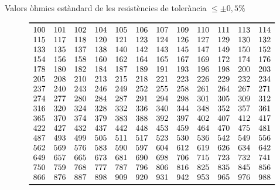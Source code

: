\begin{table}[htb]
   \caption{Valors \`{o}hmics est\`{a}ndard de les resist\`{e}ncies de toler\`{a}ncia $\leq\pm0{,}5\unit{\%}$}
   \[ \begin{array}{cccccccccccc}
   \toprule[1pt]
   100 & 101 & 102 & 104 & 105 & 106 & 107 & 109 & 110 & 111 & 113 & 114 \\
   115 & 117 & 118 & 120 & 121 & 123 & 124 & 126 & 127 & 129 & 130 & 132 \\
   133 & 135 & 137 & 138 & 140 & 142 & 143 & 145 & 147 & 149 & 150 & 152 \\
   154 & 156 & 158 & 160 & 162 & 164 & 165 & 167 & 169 & 172 & 174 & 176 \\
   178 & 180 & 182 & 184 & 187 & 189 & 191 & 193 & 196 & 198 & 200 & 203 \\
   205 & 208 & 210 & 213 & 215 & 218 & 221 & 223 & 226 & 229 & 232 & 234 \\
   237 & 240 & 243 & 246 & 249 & 252 & 255 & 258 & 261 & 264 & 267 & 271 \\
   274 & 277 & 280 & 284 & 287 & 291 & 294 & 298 & 301 & 305 & 309 & 312 \\
   316 & 320 & 324 & 328 & 332 & 336 & 340 & 344 & 348 & 352 & 357 & 361 \\
   365 & 370 & 374 & 379 & 383 & 388 & 392 & 397 & 402 & 407 & 412 & 417 \\
   422 & 427 & 432 & 437 & 442 & 448 & 453 & 459 & 464 & 470 & 475 & 481 \\
   487 & 493 & 499 & 505 & 511 & 517 & 523 & 530 & 536 & 542 & 549 & 556 \\
   562 & 569 & 576 & 583 & 590 & 597 & 604 & 612 & 619 & 626 & 634 & 642 \\
   649 & 657 & 665 & 673 & 681 & 690 & 698 & 706 & 715 & 723 & 732 & 741 \\
   750 & 759 & 768 & 777 & 787 & 796 & 806 & 816 & 825 & 835 & 845 & 856 \\
   866 & 876 & 887 & 898 & 909 & 920 & 931 & 942 & 953 & 965 & 976 & 988 \\

   \bottomrule[1pt]
   \end{array}   \]
\end{table}
